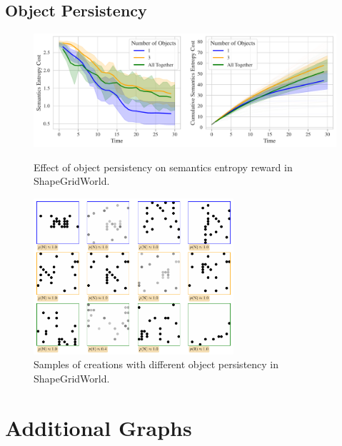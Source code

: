 \section{Object Persistency}
\label{sec:sgw-persistency}

\begin{figure}[H]
    \centering
    \includegraphics[width=\textwidth]{images/object_persistency_comparison_sgw.pdf}
    \caption{Effect of object persistency on semantics entropy reward in ShapeGridWorld.}
    \label{fig:object-persistency-sgw}
    \includegraphics[width=0.66\textwidth]{images/object_persistency_samples_sgw.pdf}
    \caption{Samples of creations with different object persistency in ShapeGridWorld.}
    \label{fig:object-persistency-samples-sgw}
\end{figure}


\chapter{Additional Graphs}
\label{sec:additional-graphs}

